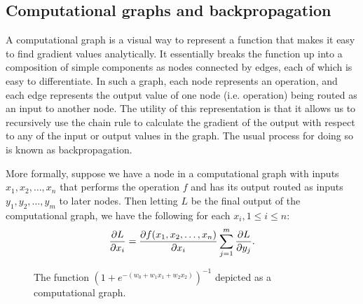 \subsection{Computational graphs and backpropagation}
A computational graph is a visual way to represent a function that makes it easy to find gradient values analytically. It essentially breaks the function up into a composition of simple components as nodes connected by edges, each of which is easy to differentiate. In such a graph, each node represents an operation, and each edge represents the output value of one node (i.e. operation) being routed as an input to another node. The utility of this representation is that it allows us to recursively use the chain rule to calculate the gradient of the output with respect to any of the input or output values in the graph. The usual process for doing so is known as backpropagation.

More formally, suppose we have a node in a computational graph with inputs $x_1, x_2, \dots, x_n$ that performs the operation $f$ and has its output routed as inputs $y_1, y_2, \dots, y_m$ to later nodes. Then letting $L$ be the final output of the computational graph, we have the following for each $x_i, 1 \le i \le n$:
$$\frac{\partial L}{\partial x_i} = \frac{\partial f(x_1, x_2, \dots, x_n)}{\partial x_i}\sum_{j=1}^m\frac{\partial L}{\partial y_j}.$$

\begin{figure} 
\centering
{}
\caption{The function $\left(1 + e^{-\left(w_0 + w_1x_1 + w_2x_2\right)}\right)^{-1}$ depicted as a computational graph.}
\label{fig4-1}
\end{figure}

